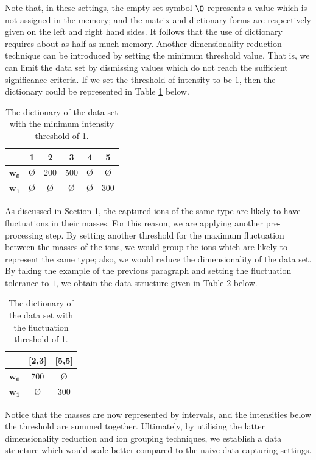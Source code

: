 \documentclass{mprop}
\begin{document}
Note that, in these settings, the empty set symbol $\O$ represents a value which is not assigned in the memory; and the matrix and dictionary forms are respectively given on the left and right hand sides. It follows that the use of dictionary requires about as half as much memory. Another dimensionality reduction technique can be introduced by setting the minimum threshold value. That is, we can limit the data set by dismissing values which do not reach the sufficient significance criteria. If we set the threshold of intensity to be $1$, then the dictionary could be represented in Table \ref{tab:d_threshhold} below.
\begin{table}[H]
\begin{center}
\begin{tabular}{|c||c|c|c|c|c|}
\hline
&1&2&3&4&5\\
\hline
$\mathbf{w_0}$&\O&200&500&\O&\O\\
$\mathbf{w_1}$&\O&\O&\O&\O&300\\
\hline
\end{tabular}
\end{center}
\caption{The dictionary of the data set with the minimum intensity threshold of 1.}
\label{tab:d_threshhold}
\end{table}

\par As discussed in Section 1, the captured ions of the same type are likely to have fluctuations in their masses. For this reason, we are applying another pre-processing step. By setting another threshold for the maximum fluctuation between the masses of the ions, we would group the ions which are likely to represent the same type; also, we would reduce the dimensionality of the data set. By taking the example of the previous paragraph and setting the fluctuation tolerance to $1$, we obtain the data structure given in Table \ref{tab:d_f_threshhold} below.
\begin{table}[H]
\begin{center}
\begin{tabular}{|c||c|c|}
\hline
&[2,3]&[5,5]\\
\hline
$\mathbf{w_0}$&700&\O\\
$\mathbf{w_1}$&\O&300\\
\hline
\end{tabular}
\end{center}
\caption{The dictionary of the data set with the fluctuation threshold of 1.}
\label{tab:d_f_threshhold}
\end{table}
Notice that the masses are now represented by intervals, and the intensities below the threshold are summed together. Ultimately, by utilising the latter dimensionality reduction and ion grouping techniques, we establish a data structure which would scale better compared to the naive data capturing settings.
\end{document}

